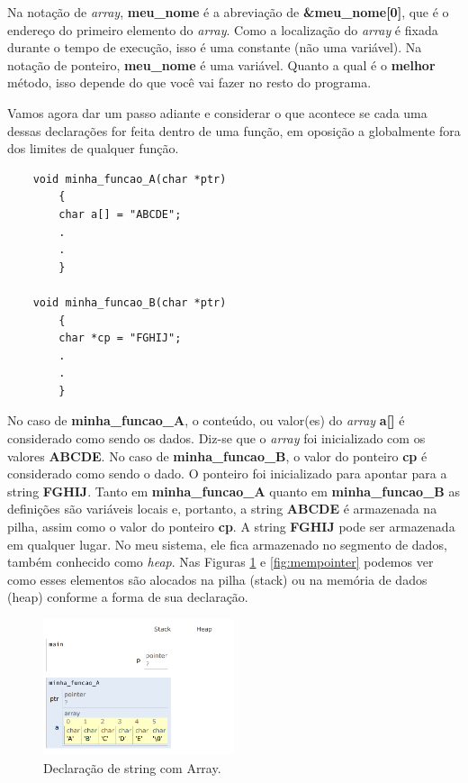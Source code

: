 Na notação de \textit{array}, \textbf{meu\_nome} é a abreviação de \textbf{\&meu\_nome[0]}, que é o endereço do primeiro elemento do \textit{array}. Como a localização do \textit{array} é fixada durante o tempo de execução, isso é uma constante (não uma variável). Na notação de ponteiro, \textbf{meu\_nome} é uma variável. Quanto a qual é o \textbf{melhor} método, isso depende do que você vai fazer no resto do programa.

Vamos agora dar um passo adiante e considerar o que acontece se cada uma dessas declarações for feita dentro de uma função, em oposição a globalmente fora dos limites de qualquer função.

\begin{lstlisting}
	void minha_funcao_A(char *ptr)
		{
		char a[] = "ABCDE";
		.
		.
		}
		
	void minha_funcao_B(char *ptr)
		{
		char *cp = "FGHIJ";
		.
		.
		}
\end{lstlisting}

No caso de \textbf{minha\_funcao\_A}, o conteúdo, ou valor(es) do \textit{array} \textbf{a[]} é considerado como sendo os dados. Diz-se que o \textit{array} foi inicializado com os valores \textbf{ABCDE}. No caso de \textbf{minha\_funcao\_B}, o valor do ponteiro \textbf{cp} é considerado como sendo o dado. O ponteiro foi inicializado para apontar para a string \textbf{FGHIJ}. Tanto em \textbf{minha\_funcao\_A} quanto em \textbf{minha\_funcao\_B} as definições são variáveis locais e, portanto, a string \textbf{ABCDE} é armazenada na pilha, assim como o valor do ponteiro \textbf{cp}. A string \textbf{FGHIJ} pode ser armazenada em qualquer lugar. No meu sistema, ele fica armazenado no segmento de dados, também conhecido como \textit{heap}. Nas Figuras \ref{fig:memarray} e \ref{fig:mempointer} podemos ver como esses elementos são alocados na pilha (stack) ou na memória de dados (heap) conforme a forma de sua declaração.

\begin{figure}[ht]
	\begin{center}
		\includegraphics[width=0.5\textwidth]{Pictures/memarray}
		\caption{Declaração de string com Array.}
		\label{fig:memarray}
	\end{center}
\end{figure}

